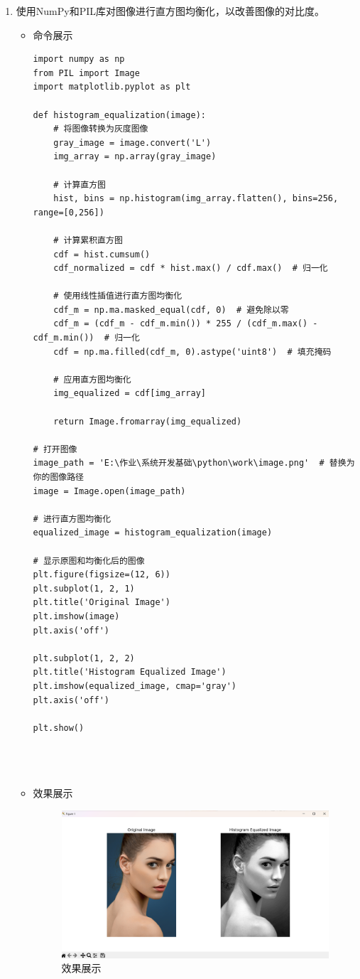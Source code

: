 \documentclass[UTF8]{ctexart}
\begin{document}
\begin{enumerate}
  \item 使用NumPy和PIL库对图像进行直方图均衡化，以改善图像的对比度。
  \begin{itemize}
  \item 命令展示
  \begin{verbatim}
import numpy as np
from PIL import Image
import matplotlib.pyplot as plt

def histogram_equalization(image):
    # 将图像转换为灰度图像
    gray_image = image.convert('L')
    img_array = np.array(gray_image)

    # 计算直方图
    hist, bins = np.histogram(img_array.flatten(), bins=256, range=[0,256])

    # 计算累积直方图
    cdf = hist.cumsum()
    cdf_normalized = cdf * hist.max() / cdf.max()  # 归一化

    # 使用线性插值进行直方图均衡化
    cdf_m = np.ma.masked_equal(cdf, 0)  # 避免除以零
    cdf_m = (cdf_m - cdf_m.min()) * 255 / (cdf_m.max() - cdf_m.min())  # 归一化
    cdf = np.ma.filled(cdf_m, 0).astype('uint8')  # 填充掩码

    # 应用直方图均衡化
    img_equalized = cdf[img_array]
    
    return Image.fromarray(img_equalized)

# 打开图像
image_path = 'E:\作业\系统开发基础\python\work\image.png'  # 替换为你的图像路径
image = Image.open(image_path)

# 进行直方图均衡化
equalized_image = histogram_equalization(image)

# 显示原图和均衡化后的图像
plt.figure(figsize=(12, 6))
plt.subplot(1, 2, 1)
plt.title('Original Image')
plt.imshow(image)
plt.axis('off')

plt.subplot(1, 2, 2)
plt.title('Histogram Equalized Image')
plt.imshow(equalized_image, cmap='gray')
plt.axis('off')

plt.show()


    
  \end{verbatim}


\item 效果展示
  \begin{figure}[H]
    \centering
    \includegraphics[width=\textwidth]{335} %
    \caption{效果展示}
  \end{figure}
  \end{itemize}
\end{enumerate}
\end{document}

